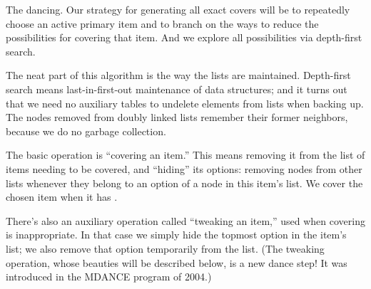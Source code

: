 The dancing.
Our strategy for generating all exact covers will be to repeatedly
choose an active primary item and to branch on the ways to reduce
the possibilities for covering that item.
And we explore all possibilities via depth-first search.

The neat part of this algorithm is the way the lists are maintained.
Depth-first search means last-in-first-out maintenance of data structures;
and it turns out that we need no auxiliary tables to undelete elements from
lists when backing up. The nodes removed from doubly linked lists remember
their former neighbors, because we do no garbage collection.

The basic operation is ``covering an item.'' This means removing it
from the list of items needing to be covered, and ``hiding'' its
options: removing nodes from other lists whenever they belong to an option of
a node in this item's list. We cover the chosen item when it has
.

There's also an auxiliary operation called ``tweaking an item,'' used when
covering is inappropriate. In that case we simply hide the topmost option
in the item's list; we also remove that option temporarily from the list.
(The tweaking operation, whose beauties will be described below,
is a new dance step! It was introduced in the {\mc MDANCE} program of 2004.)

